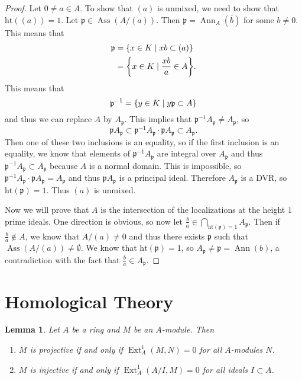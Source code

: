 \documentclass[leqno, openany]{memoir}
\newtheorem{lem}[thm]{Lemma}
\theoremstyle{definition}
\theoremstyle{remark}
\theoremstyle{plain}
\theoremstyle{definition}
\theoremstyle{remark}
\newcommand{\mf}[1]{\mathfrak{#1}}
\newcommand{\mr}[1]{\mathrm{#1}}
\newcommand{\ol}[1]{\overline{#1}}
\DeclareMathOperator{\Ext}{Ext}
\DeclareMathOperator{\Ann}{Ann}
\DeclareMathOperator{\Ass}{Ass}
\begin{document}
\begin{proof}
    Let $0 \neq a \in A$. To show that $(a)$ is unmixed, we need to show that $\mr{ht}((a)) = 1$. Let $\mf{p} \in \Ass(A/(a))$. Then $\mf{p} = \Ann_A(\ol{b})$ for some $b \neq 0$. This means that
    \begin{align*}
        \mf{p} &= \qty{x \in K \mid xb \subset (a)} \\
               &= \qty{x \in K \mid \frac{xb}{a} \in A}.
    \end{align*}
    This means that
    \[ \mf{p}^{-1} = \qty{y \in K \mid y \mf{p} \subset A} \]
    and thus we can replace $A$ by $A_{\mf{p}}$. This implies that $\mf{p}^{-1} A_{\mf{p}} \neq A_{\mf{p}}$, so
    \[ \mf{p} A_{\mf{p}} \subset \mf{p}^{-1} A_{\mf{p}} \cdot \mf{p} A_{\mf{p}} \subset A_{\mf{p}}. \]
    Then one of these two inclusions is an equality, so if the first inclusion is an equality, we know that elements of $\mf{p}^{-1}A_{\mf{p}}$ are integral over $A_{\mf{p}}$ and thus $\mf{p}^{-1}A_{\mf{p}} \subset A_{\mf{p}}$ because $A$ is a normal domain. This is impossible, so $\mf{p}^{-1}A_{\mf{p}} \cdot \mf{p}A_{\mf{p}} = A_{\mf{p}}$ and thus $\mf{p}A_{\mf{p}}$ is a principal ideal. Therefore $A_{\mf{p}}$ is a DVR, so $\mr{ht}(\mf{p}) = 1$. Thus $(a)$ is unmixed.

    Now we will prove that $A$ is the intersection of the localizations at the height $1$ prime ideals. One direction is obvious, so now let $\frac{b}{a} \in \bigcap_{\mr{ht}(\mf{p})=1} A_{\mf{p}}$. Then if $\frac{b}{a} \notin A$, we know that $A/(a) \neq 0$ and thus there exists $\mf{p}$ such that $\Ass(A/(a)) \neq \emptyset$. We know that $\mr{ht}(\mf{p}) = 1$, so $A_{\mf{p}} \neq \mf{p} = \Ann(b)$, a contradiction with the fact that $\frac{b}{a} \in A_{\mf{p}}$.
\end{proof}

\section{Homological Theory}%
\label{sec:homological_theory}

\begin{lem}
    Let $A$ be a ring and $M$ be an $A$-module. Then
    \begin{enumerate}
        \item $M$ is projective if and only if $\Ext_A^1(M,N) = 0$ for all $A$-modules $N$.
        \item $M$ is injective if and only if $\Ext_A^1(A/I, M) = 0$ for all ideals $I \subset A$.
    \end{enumerate}
\end{lem}
\end{document}
